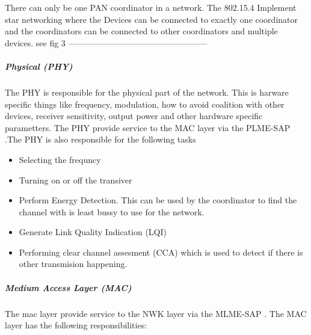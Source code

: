 \documentclass[a4paper,12pt,english]{article}
\begin{document}
There can only be one PAN coordinator 
in a network. The 802.15.4 Implement star networking where the Devices can
be connected to exactly one coordinator and the coordinators can be connected to
other coordinators and multiple devices. see fig 3
-------------------------------------------------- 
\subparagraph{Physical (PHY)}
The PHY is responsible for the physical part of the network. This is
harware specific things like frequency, modulation, how to avoid coalition
with other devices, receiver sensitivity, output power and other hardware
specific parametters. The PHY provide service to the MAC layer via the
PLME-SAP .The PHY is also responsible for the
following tasks
\begin{itemize}
  \item Selecting the frequncy
  \item Turning on or off the transiver
  \item Perform Energy Detection. This can be used by the coordinator to find
  the channel with is least bussy to use for the network.
  \item Generate Link Quality Indication (LQI) 
  \item Performing clear channel assesment (CCA) which is used to detect if there is other transmision happening.
  \end{itemize}
  
\subparagraph{Medium Access Layer (MAC)}
The mac layer provide service to the NWK layer via the MLME-SAP
.
The MAC layer has the following responsibilities:
\end{document}

